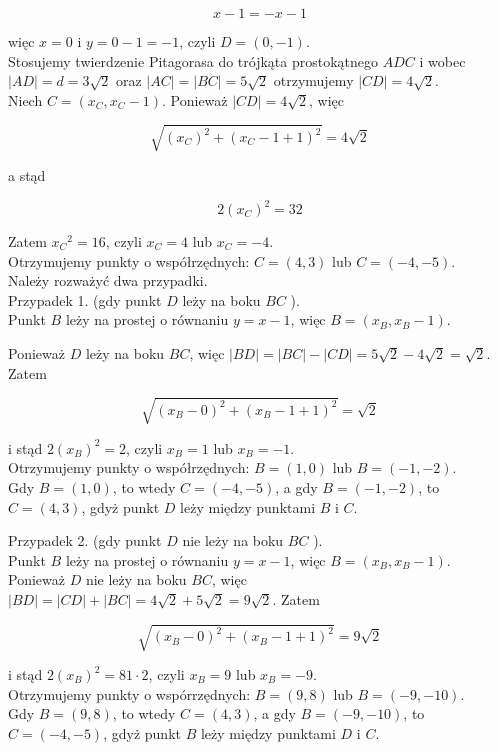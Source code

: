 \documentclass[10pt]{article}
\begin{document}
$$
x-1=-x-1
$$

więc $x=0$ i $y=0-1=-1$, czyli $D=(0,-1)$.\\
Stosujemy twierdzenie Pitagorasa do trójkąta prostokątnego $A D C$ i wobec\\
$|A D|=d=3 \sqrt{2}$ oraz $|A C|=|B C|=5 \sqrt{2}$ otrzymujemy $|C D|=4 \sqrt{2}$.\\
Niech $C=\left(x_{C}, x_{C}-1\right)$. Ponieważ $|C D|=4 \sqrt{2}$, więc

$$
\sqrt{\left(x_{C}\right)^{2}+\left(x_{C}-1+1\right)^{2}}=4 \sqrt{2}
$$

a stąd

$$
2\left(x_{C}\right)^{2}=32
$$

Zatem $x_{C}{ }^{2}=16$, czyli $x_{C}=4$ lub $x_{C}=-4$.\\
Otrzymujemy punkty o współrzędnych: $C=(4,3)$ lub $C=(-4,-5)$.\\
Należy rozważyć dwa przypadki.\\
Przypadek 1. (gdy punkt $D$ leży na boku $B C$ ).\\
Punkt $B$ leży na prostej o równaniu $y=x-1$, więc $B=\left(x_{B}, x_{B}-1\right)$.

Ponieważ $D$ leży na boku $B C$, więc $|B D|=|B C|-|C D|=5 \sqrt{2}-4 \sqrt{2}=\sqrt{2}$. Zatem

$$
\sqrt{\left(x_{B}-0\right)^{2}+\left(x_{B}-1+1\right)^{2}}=\sqrt{2}
$$

i stąd $2\left(x_{B}\right)^{2}=2$, czyli $x_{B}=1$ lub $x_{B}=-1$.\\
Otrzymujemy punkty o współrzędnych: $B=(1,0)$ lub $B=(-1,-2)$.\\
Gdy $B=(1,0)$, to wtedy $C=(-4,-5)$, a gdy $B=(-1,-2)$, to $C=(4,3)$, gdyż punkt $D$ leży między punktami $B$ i $C$.

Przypadek 2. (gdy punkt $D$ nie leży na boku $B C$ ).\\
Punkt $B$ leży na prostej o równaniu $y=x-1$, więc $B=\left(x_{B}, x_{B}-1\right)$.\\
Ponieważ $D$ nie leży na boku $B C$, więc $|B D|=|C D|+|B C|=4 \sqrt{2}+5 \sqrt{2}=9 \sqrt{2}$. Zatem

$$
\sqrt{\left(x_{B}-0\right)^{2}+\left(x_{B}-1+1\right)^{2}}=9 \sqrt{2}
$$

i stąd $2\left(x_{B}\right)^{2}=81 \cdot 2$, czyli $x_{B}=9$ lub $x_{B}=-9$.\\
Otrzymujemy punkty o wspórrzędnych: $B=(9,8)$ lub $B=(-9,-10)$.\\
Gdy $B=(9,8)$, to wtedy $C=(4,3)$, a gdy $B=(-9,-10)$, to $C=(-4,-5)$, gdyż punkt $B$ leży między punktami $D$ i $C$.
\end{document}
